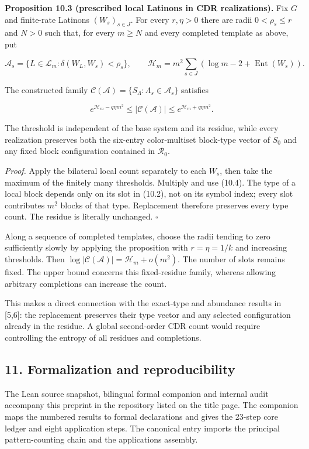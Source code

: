 \documentclass[english,11pt,a4paper]{article}
\begin{document}
\textbf{Proposition 10.3 (prescribed local Latinons in CDR realizations).} Fix \(G\) and finite-rate Latinons \((W_s)_{s\in J}\). For every \(r,\eta>0\) there are radii \(0<\rho_s\le r\) and \(N>0\) such that, for every \(m\ge N\) and every completed template as above, put

\nopagebreak[4]
\[\mathcal A_s=\{L\in\mathcal L_m:\delta(W_L,W_s)<\rho_s\},\qquad
\mathcal H_m=m^2\sum_{s\in J}(\log m-2+\operatorname{Ent}(W_s)).\tag{10.5}\]

The constructed family \(\mathcal C(\mathcal A)=\{S_\Lambda:\Lambda_s\in\mathcal A_s\}\) satisfies

\nopagebreak[4]
\[e^{\mathcal H_m-q\eta m^2}\le|\mathcal C(\mathcal A)|\le e^{\mathcal H_m+q\eta m^2}.\tag{10.6}\]

The threshold is independent of the base system and its residue, while every realization preserves both the six-entry color-multiset block-type vector of \(S_0\) and any fixed block configuration contained in \(\mathcal R_0\).

\emph{Proof.} Apply the bilateral local count separately to each \(W_s\), then take the maximum of the finitely many thresholds. Multiply and use (10.4). The type of a local block depends only on its slot in (10.2), not on its symbol index; every slot contributes \(m^2\) blocks of that type. Replacement therefore preserves every type count. The residue is literally unchanged. \(\square\)

Along a sequence of completed templates, choose the radii tending to zero sufficiently slowly by applying the proposition with \(r=\eta=1/k\) and increasing thresholds. Then \(\log|\mathcal C(\mathcal A)|=\mathcal H_m+o(m^2)\). The number of slots remains fixed. The upper bound concerns this fixed-residue family, whereas allowing arbitrary completions can increase the count.

This makes a direct connection with the exact-type and abundance results in {[}5,6{]}: the replacement preserves their type vector and any selected configuration already in the residue. A global second-order CDR count would require controlling the entropy of all residues and completions.

\subsection{11. Formalization and reproducibility}\label{formalization-and-reproducibility}

The Lean source snapshot, bilingual formal companion and internal audit accompany this preprint in the repository listed on the title page. The companion maps the numbered results to formal declarations and gives the 23-step core ledger and eight application steps. The canonical entry  imports the principal pattern-counting chain and the applications assembly.
\end{document}
